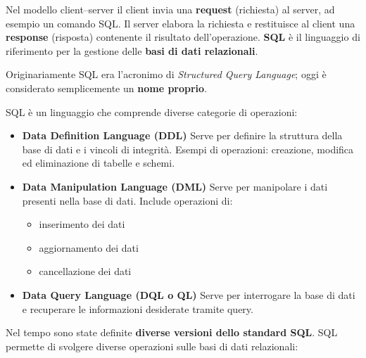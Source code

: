 Nel modello client--server il client invia una \textbf{request} (richiesta) al server, ad esempio un comando SQL.  
Il server elabora la richiesta e restituisce al client una \textbf{response} (risposta) contenente il risultato dell'operazione.
\textbf{SQL} è il linguaggio di riferimento per la gestione delle \textbf{basi di dati relazionali}.

Originariamente SQL era l'acronimo di \textit{Structured Query Language}; oggi è considerato semplicemente un \textbf{nome proprio}.

SQL è un linguaggio che comprende diverse categorie di operazioni:

\begin{itemize}
	
	\item \textbf{Data Definition Language (DDL)}  
	Serve per definire la struttura della base di dati e i vincoli di integrità.  
	Esempi di operazioni: creazione, modifica ed eliminazione di tabelle e schemi.
	
	\item \textbf{Data Manipulation Language (DML)}  
	Serve per manipolare i dati presenti nella base di dati.  
	Include operazioni di:
	\begin{itemize}
		\item inserimento dei dati
		\item aggiornamento dei dati
		\item cancellazione dei dati
	\end{itemize}
	
	\item \textbf{Data Query Language (DQL o QL)}  
	Serve per interrogare la base di dati e recuperare le informazioni desiderate tramite query.
	
\end{itemize}

Nel tempo sono state definite \textbf{diverse versioni dello standard SQL}.
SQL permette di svolgere diverse operazioni sulle basi di dati relazionali:

